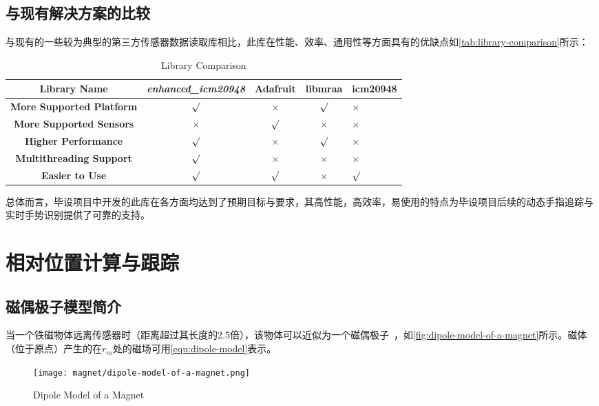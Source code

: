 \subsection{与现有解决方案的比较}
与现有的一些较为典型的第三方传感器数据读取库相比，此库在性能、效率、通用性等方面具有的优缺点如\autoref{tab:library-comparison}所示：
\begin{table}[ht]
    \caption{\label{tab:library-comparison}Library Comparison}
    \begin{tabularx}{\linewidth}{c|c|c|c|X<{\centering}|}
        \hline
        {\bfseries Library Name} & {\bfseries \itshape enhanced\_icm20948} & Adafruit & libmraa & icm20948\\ \hline
        {\bfseries More Supported Platform} & {$\surd$} & {$\times$} & {$\surd$} & {$\times$} \\ \hline
        {\bfseries More Supported Sensors} & {$\times$} & {$\surd$} & {$\times$} & {$\times$} \\ \hline
        {\bfseries Higher Performance} & {$\surd$} & {$\times$} & {$\surd$} & {$\times$} \\ \hline
        {\bfseries Multithreading Support} & {$\surd$} & {$\times$} & {$\times$} & {$\times$} \\ \hline
        {\bfseries Easier to Use} & {$\surd$} & {$\surd$} & {$\times$} & {$\surd$} \\ \hline
    \end{tabularx}
\end{table}

总体而言，毕设项目中开发的此库在各方面均达到了预期目标与要求，其高性能，高效率，易使用的特点为毕设项目后续的动态手指追踪与实时手势识别提供了可靠的支持。

\cleardoublepage
\section{相对位置计算与跟踪}
\subsection{磁偶极子模型简介}
当一个铁磁物体远离传感器时（距离超过其长度的2.5倍），该物体可以近似为一个磁偶极子~\cite{mainArticle3}，如\autoref{fig:dipole-model-of-a-magnet}所示。磁体（位于原点）产生的在$r_m$处的磁场可用\autoref{equ:dipole-model}表示。

\begin{figure}[H]
    \centering
    \texttt{[image: magnet/dipole-model-of-a-magnet.png]}
    \caption{\label{fig:dipole-model-of-a-magnet}Dipole Model of a Magnet}
\end{figure}

